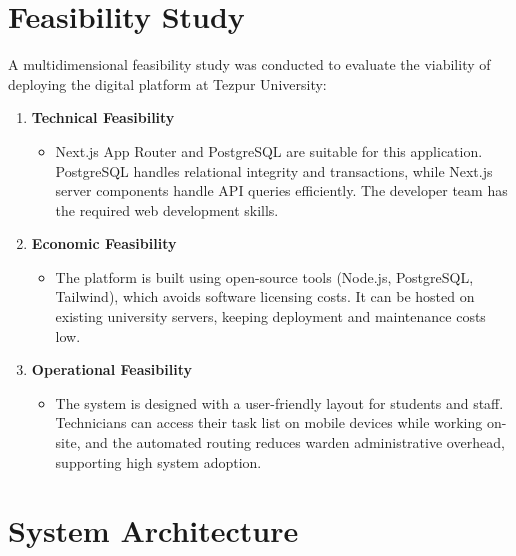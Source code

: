 \documentclass[12pt,a4paper]{article}
\begin{document}
\newpage
\section{Feasibility Study}
A multidimensional feasibility study was conducted to evaluate the viability of deploying the digital platform at Tezpur University:
\begin{enumerate}
    \item \textbf{Technical Feasibility}
    \begin{itemize}
        \item Next.js App Router and PostgreSQL are suitable for this application. PostgreSQL handles relational integrity and transactions, while Next.js server components handle API queries efficiently. The developer team has the required web development skills.
    \end{itemize}
    \item \textbf{Economic Feasibility}
    \begin{itemize}
        \item The platform is built using open-source tools (Node.js, PostgreSQL, Tailwind), which avoids software licensing costs. It can be hosted on existing university servers, keeping deployment and maintenance costs low.
    \end{itemize}
    \item \textbf{Operational Feasibility}
    \begin{itemize}
        \item The system is designed with a user-friendly layout for students and staff. Technicians can access their task list on mobile devices while working on-site, and the automated routing reduces warden administrative overhead, supporting high system adoption.
    \end{itemize}
\end{enumerate}

\newpage
\section{System Architecture}
\end{document}
